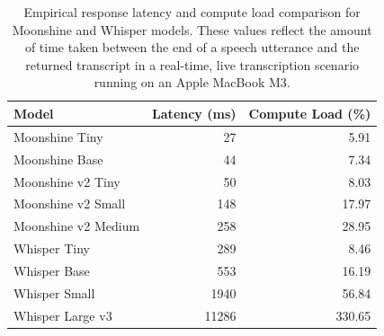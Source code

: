 \begin{table}[t]
  \centering
  \small
  \begin{tabular}{l r r}
  \toprule
  Model & Latency (ms) & Compute Load (\%) \\
  \midrule
  \rowcolor{black!10} Moonshine Tiny & 27 & 5.91 \\
  \rowcolor{black!10} Moonshine Base & 44 & 7.34 \\
  \rowcolor{black!10} Moonshine v2 Tiny & 50 & 8.03 \\
  \rowcolor{black!10} Moonshine v2 Small & 148 & 17.97 \\
  \rowcolor{black!10} Moonshine v2 Medium & 258 & 28.95 \\
  Whisper Tiny & 289 & 8.46 \\
  Whisper Base & 553 & 16.19 \\
  Whisper Small & 1940 & 56.84 \\
  Whisper Large v3 & 11286 & 330.65 \\
  \bottomrule
  \end{tabular}
  \caption{Empirical response latency and compute load comparison for Moonshine and Whisper models. These values reflect the amount of time taken between the end of a speech utterance and the returned transcript in a real-time, live transcription scenario running on an Apple MacBook M3.}
  \label{tab:latency-comparison}
\end{table}